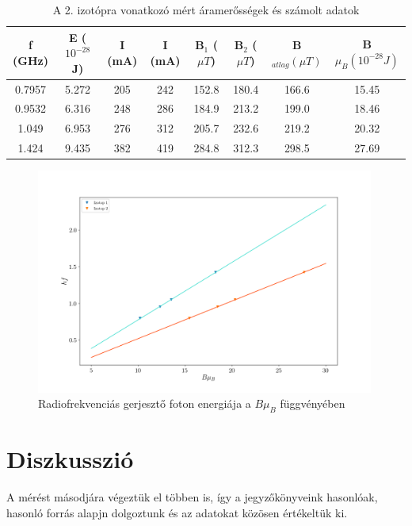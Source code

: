\documentclass[12pt]{article}
\theoremstyle{plain}
\begin{document}
\begin{table}[H]
\begin{tabular}{|c|c|c|c|c|c|c|c|} \hline
f (GHz) & E ($10^{-28}$J) & I (mA) & I (mA) & B$_1$ ($\mu T$) & B$_2$ ($\mu T$) &B$_{atlag} (\mu T)$& B$\mu_B (10^{-28} J)$ \\ \hline
0.7957  & 5.272 & 205&	242	&152.8&	180.4&	166.6&15.45 \\ \hline
0.9532  &	6.316&	248&	286&	184.9	&213.2&	199.0&18.46\\ \hline
1.049   &	6.953&276&	312&	205.7&	232.6&	219.2&20.32	\\ \hline
1.424	  &9.435&382&419&	284.8&	312.3&	298.5&    27.69\\
\hline
\end{tabular}
\caption{A 2. izotópra vonatkozó mért áramerősségek és számolt adatok}
\label{tab:4}
\end{table}

\begin{figure}[H]
\includegraphics[width=0.99\textwidth]{j/gf2.png}
\centering
\caption{Radiofrekvenciás gerjesztő foton energiája a $B\mu_B$ függvényében}
\label{fig:3}
\end{figure}
\pagebreak
\section{Diszkusszió}
\par A mérést másodjára végeztük el többen is, így a jegyzőkönyveink hasonlóak, hasonló forrás alapjn dolgoztunk és az adatokat közösen értékeltük ki.

\clearpage



\end{document}
